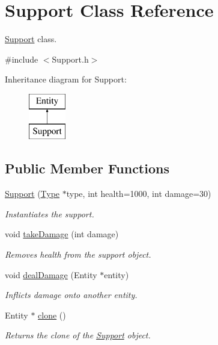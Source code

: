 \hypertarget{classSupport}{}\section{Support Class Reference}
\label{classSupport}


\hyperlink{classSupport}{Support} class.  




{\ttfamily \#include $<$Support.\+h$>$}

Inheritance diagram for Support\+:\begin{figure}[H]
\begin{center}
\leavevmode
\includegraphics[height=2.000000cm]{classSupport}
\end{center}
\end{figure}
\subsection*{Public Member Functions}
\begin{DoxyCompactItemize}
\item 
\hyperlink{classSupport_a8b4c631dcfd81be50ee86f3ed01d5c1e}{Support} (\hyperlink{classType}{Type} $\ast$type, int health=1000, int damage=30)
\begin{DoxyCompactList}\small\item\em Instantiates the support. \end{DoxyCompactList}\item 
void \hyperlink{classSupport_afb159bd8c474ec67ad5d03fa24c38564}{take\+Damage} (int damage)
\begin{DoxyCompactList}\small\item\em Removes health from the support object. \end{DoxyCompactList}\item 
void \hyperlink{classSupport_a5f2cb243e746adea36b3c78548029ce3}{deal\+Damage} (Entity $\ast$entity)
\begin{DoxyCompactList}\small\item\em Inflicts damage onto another entity. \end{DoxyCompactList}\item 
Entity $\ast$ \hyperlink{classSupport_aa54197d3679118ba6c2dfaf7f15ac5de}{clone} ()
\begin{DoxyCompactList}\small\item\em Returns the clone of the \hyperlink{classSupport}{Support} object. \end{DoxyCompactList}\end{DoxyCompactItemize}


